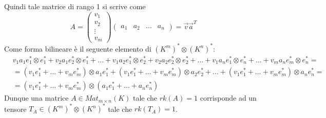 \documentclass[10pt,a4paper,twoside]{book}
\begin{document}
Quindi tale matrice di rango 1 si scrive come
\begin{equation*}
    A = \begin{pmatrix}
        v_1    \\
        v_2    \\
        \vdots \\
        v_m
    \end{pmatrix}
    \begin{pmatrix}
        a_1 & a_2 & \ldots & a_n
    \end{pmatrix} = \overrightarrow{v} \overrightarrow{a}^T
\end{equation*}
Come forma bilineare è il seguente elemento di $(K^m)^* \otimes (K^n)^*$:
\begin{align*}
     & v_1 a_1 e_1^* \otimes e_1^* + v_2 a_1 e_2^* \otimes e_1^* + \ldots + v_1 a_2 e_1^* \otimes e_2^* + v_2 a_2 e_2^* \otimes e_2^* + \ldots + v_1 a_n e_1^* \otimes e_n^* + \ldots + v_m a_n e_m^* \otimes e_n^* = \\
     & = (v_1 e_1^* + \ldots + v_m e_m^*) \otimes a_1 e_1^* + (v_1 e_1^* + \ldots +v_m e_m^*) \otimes a_2 e_2^* + \ldots +(v_1 e_1^* + \ldots + v_m e_m^*) \otimes a_n e_n^* =                                        \\
     & = (v_1 e_1^* + \ldots + v_m e_m^*) \otimes (a_1 e_1^* + \ldots + a_n e_n^*)
\end{align*}
Dunque una matrice $A \in Mat_{m \times n} (K)$ tale che $rk(A) = 1$ corrisponde ad un tensore $T_A \in (K^m)^* \otimes (K^n)^*$ tale che $rk(T_A) = 1$.
\end{document}
